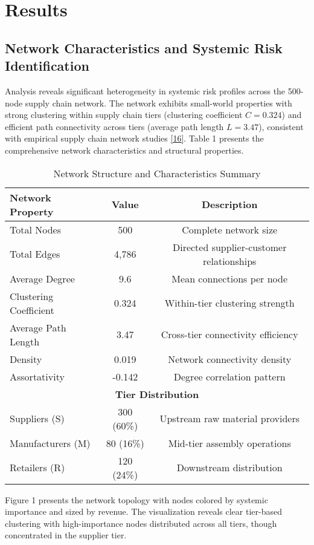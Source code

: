\documentclass[a4 paper, 11pt,twoside]{article}
\newcommand{\0}{\Bf{0}}
\theoremstyle{definition}
\begin{document}
\section{Results}

\subsection{Network Characteristics and Systemic Risk Identification}

Analysis reveals significant heterogeneity in systemic risk profiles across the 500-node supply chain network. The network exhibits small-world properties with strong clustering within supply chain tiers (clustering coefficient $C = 0.324$) and efficient path connectivity across tiers (average path length $L = 3.47$), consistent with empirical supply chain network studies \hyperref[ref16]{[16]}. Table 1 presents the comprehensive network characteristics and structural properties.

\begin{table}[H]
\centering
\caption{Network Structure and Characteristics Summary}
\begin{tabular}{@{}lcc@{}}
\toprule
\textbf{Network Property} & \textbf{Value} & \textbf{Description} \\
\midrule
Total Nodes & 500 & Complete network size \\
Total Edges & 4,786 & Directed supplier-customer relationships \\
Average Degree & 9.6 & Mean connections per node \\
Clustering Coefficient & 0.324 & Within-tier clustering strength \\
Average Path Length & 3.47 & Cross-tier connectivity efficiency \\
Density & 0.019 & Network connectivity density \\
Assortativity & -0.142 & Degree correlation pattern \\
\midrule
\multicolumn{3}{c}{\textbf{Tier Distribution}} \\
\midrule
Suppliers (S) & 300 (60\%) & Upstream raw material providers \\
Manufacturers (M) & 80 (16\%) & Mid-tier assembly operations \\
Retailers (R) & 120 (24\%) & Downstream distribution \\
\bottomrule
\end{tabular}
\end{table}

Figure 1 presents the network topology with nodes colored by systemic importance and sized by revenue. The visualization reveals clear tier-based clustering with high-importance nodes distributed across all tiers, though concentrated in the supplier tier.
\end{document}
